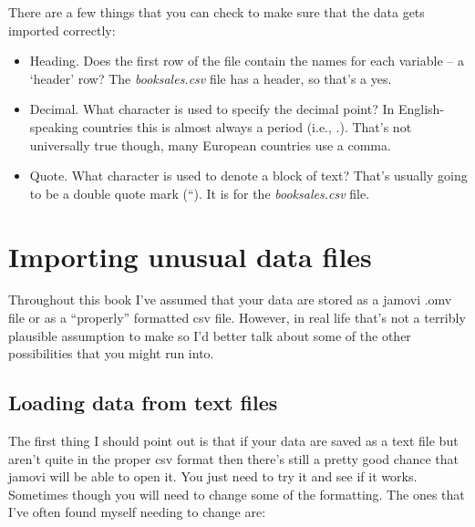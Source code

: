 \documentclass[
  a4paper,
]{book}
\providecommand{\tightlist}{%
  \setlength{\itemsep}{0pt}\setlength{\parskip}{0pt}}\usepackage{longtable,booktabs,array}
\begin{document}
There are a few things that you can check to make sure that the data
gets imported correctly:

\begin{itemize}
\tightlist
\item
  Heading. Does the first row of the file contain the names for each
  variable -- a `header' row? The \emph{booksales.csv} file has a
  header, so that's a yes.
\item
  Decimal. What character is used to specify the decimal point? In
  English-speaking countries this is almost always a period (i.e., .).
  That's not universally true though, many European countries use a
  comma.
\item
  Quote. What character is used to denote a block of text? That's
  usually going to be a double quote mark (``). It is for the
  \emph{booksales.csv} file.
\end{itemize}

\hypertarget{importing-unusual-data-files}{%
\section{Importing unusual data
files}\label{importing-unusual-data-files}}

Throughout this book I've assumed that your data are stored as a jamovi
.omv file or as a ``properly'' formatted csv file. However, in real life
that's not a terribly plausible assumption to make so I'd better talk
about some of the other possibilities that you might run into.

\hypertarget{loading-data-from-text-files}{%
\subsection{Loading data from text
files}\label{loading-data-from-text-files}}

The first thing I should point out is that if your data are saved as a
text file but aren't quite in the proper csv format then there's still a
pretty good chance that jamovi will be able to open it. You just need to
try it and see if it works. Sometimes though you will need to change
some of the formatting. The ones that I've often found myself needing to
change are:
\end{document}
